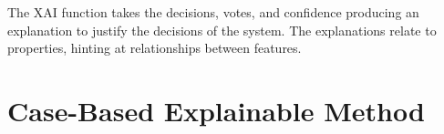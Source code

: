 The XAI function takes the decisions, votes, and confidence producing an
explanation to justify the decisions of the system.  The explanations relate to
properties, hinting at relationships between features.





\section{Case-Based Explainable Method} \label{case_explainable_arch}


